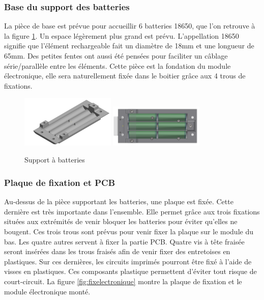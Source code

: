 \subsubsection{Base du support des batteries}

La pièce de base est prévue pour accueillir 6 batteries 18650, que l'on retrouve à la figure \ref{fig:supportbatteries}.
Un espace légèrement plus grand est 
prévu. L’appellation 18650 signifie que l’élément rechargeable fait un diamètre de 18mm et une longueur 
de 65mm. Des petites fentes ont aussi été pensées pour faciliter un câblage série/parallèle entre les 
éléments. Cette pièce est la fondation du module électronique, elle sera naturellement fixée dans le 
boitier grâce aux 4 trous de fixations.

\begin{figure}[H]
    \centering
    \includegraphics[width=0.4\textwidth]{Images/photos_PGA/moduleFondbat.PNG}
    \includegraphics[width=0.4\textwidth]{Images/photos_PGA/bateriebl.PNG}
    \caption{Support à batteries}
    \label{fig:supportbatteries}
\end{figure}

\subsubsection{Plaque de fixation et PCB}

Au-dessus de la pièce supportant les batteries, une plaque est fixée. Cette dernière est très importante 
dans l’ensemble. Elle permet grâce aux trois fixations situées aux extrémités de venir bloquer les batteries 
pour éviter qu'elles ne bougent. Ces trois trous sont prévus pour venir fixer la plaque 
sur le module du bas. Les quatre autres servent à fixer la partie PCB. Quatre vis à tête fraisée seront 
insérées dans les trous fraisés afin de venir fixer des entretoises en plastiques. Sur ces dernières, 
les circuits imprimés pourront être fixé à l’aide de visses en plastiques. Ces composants 
plastique permettent d’éviter tout risque de court-circuit. La figure \ref{fig:fixelectronique} montre la plaque
de fixation et le module électronique monté.

